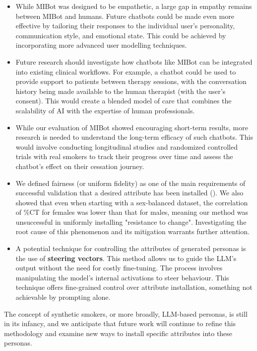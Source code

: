 \begin{itemize}
	\item While MIBot was designed to be empathetic, a large gap in empathy remains between MIBot and humans. Future chatbots could be made even more effective by tailoring their responses to the individual user's personality, communication style, and emotional state. This could be achieved by incorporating more advanced user modelling techniques.
	\item Future research should investigate how chatbots like MIBot can be integrated into existing clinical workflows. For example, a chatbot could be used to provide support to patients between therapy sessions, with the conversation history being made available to the human therapist (with the user's consent). This would create a blended model of care that combines the scalability of AI with the expertise of human professionals.
	\item While our evaluation of MIBot showed encouraging short-term results, more research is needed to understand the long-term efficacy of such chatbots. This would involve conducting longitudinal studies and randomized controlled trials with real smokers to track their progress over time and assess the chatbot's effect on their cessation journey.
	\item  We defined fairness (or uniform fidelity) as one of the main requirements of successful validation that a desired attribute has been installed (). We also showed that even when starting with a sex-balanced dataset, the correlation of \%CT for females was lower than that for males, meaning our method was unsuccessful in uniformly installing "resistance to change". Investigating the root cause of this phenomenon and its mitigation warrants further attention.
	\item A potential technique for controlling the attributes of generated personas is the use of \textbf{steering vectors}. This method allows us to guide the LLM's output without the need for costly fine-tuning. The process involves manipulating the model's internal activations to steer behaviour. This technique offers fine-grained control over attribute installation, something not achievable by prompting alone.
\end{itemize}

The concept of synthetic smokers, or more broadly, LLM-based personas, is still in its infancy, and we anticipate that future work will continue to refine this methodology and examine new ways to install specific attributes into these personas.

